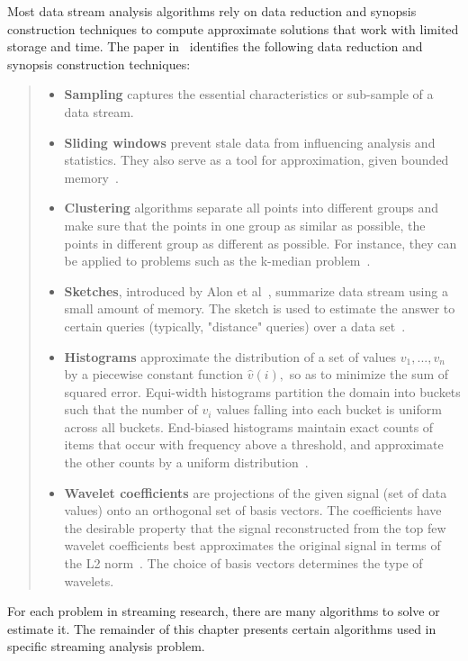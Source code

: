 \documentclass{report}
\begin{document}
Most data stream analysis algorithms rely on data reduction and synopsis construction techniques to compute approximate solutions that work with limited storage and time. The paper in~\cite{kejariwal2015real} identifies the following data reduction and synopsis construction techniques: 
\begin{quote}
\begin{itemize}
    \item  \textbf{Sampling} captures the essential characteristics or sub-sample of a data stream.
    \item \textbf{Sliding windows} prevent stale data from influencing analysis and statistics. They also serve as a tool for approximation, given bounded memory~\cite{kejariwal2015real}.
    \item \textbf{Clustering} algorithms separate all points into different groups and make sure that the points in one group as similar as possible, the points in different group as different as possible. For instance, they can be applied to problems such as the k-median problem~\cite{kejariwal2015real}. 
    \item \textbf{Sketches}, introduced by Alon et al~\cite{alon1999space}, summarize data stream using a small amount of memory. The sketch is used to estimate the answer to certain queries (typically, "distance" queries) over a data set~\cite{kejariwal2015real}.
    \item \textbf{Histograms} approximate the distribution of a set of values $v_1, ..., v_n$ by a piecewise constant function $\hat{v}(i),$ so as to minimize the sum of squared error. Equi-width histograms partition the domain into buckets such that the number of $v_i$ values falling into each bucket is uniform across all buckets. End-biased histograms maintain exact counts of items that occur with frequency above a threshold, and approximate the other counts by a uniform distribution~\cite{kejariwal2015real}.
    \item \textbf{Wavelet coefficients} are projections of the given signal (set of data values) onto an orthogonal set of basis vectors. The coefficients have the desirable property that the signal reconstructed from the top few wavelet coefficients best approximates the original signal in terms of the L2 norm~\cite{gilbert2002fast}. The choice of basis vectors determines the type of wavelets.
\end{itemize}
\end{quote}

For each problem in streaming research, there are many algorithms to solve or estimate it. The remainder of this chapter presents certain algorithms used in specific streaming analysis problem.
\end{document}
